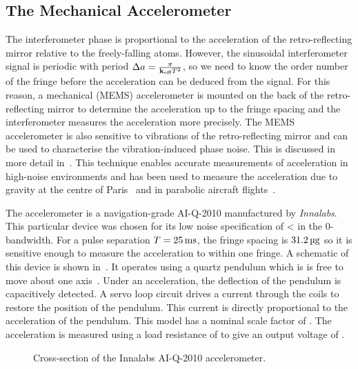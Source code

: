 \subsection{The Mechanical Accelerometer}\label{subsec:raman_mems}
The interferometer phase is proportional to the acceleration of the
retro-reflecting mirror relative to the freely-falling atoms. However,
the sinusoidal interferometer signal is periodic with period
\(\Delta a = \frac{\pi}{{\textbf k_\textnormal{eff}} T^2}\), so we need to know the order
number of the fringe before the acceleration can be deduced from the
signal. For this reason, a mechanical (MEMS)
accelerometer is mounted on the back of the retro-reflecting mirror to determine the acceleration up to the fringe spacing and the interferometer measures the acceleration more
precisely. 
The MEMS accelerometer is also sensitive to vibrations of the
retro-reflecting mirror and can be used to characterise the
vibration-induced phase noise. This is discussed in more detail
in~. This technique enables
accurate measurements of acceleration in high-noise environments and has been
used to measure the acceleration due to gravity at the centre of
Paris~\cite{Merlet2009} and in parabolic aircraft
flights~\cite{Geiger2011a,Barrett2016}. 
\par\noindent 
The accelerometer is a navigation-grade AI-Q-2010 manufactured by \textit{Innalabs}. This particular
device was chosen for its low noise specification of
< in the 0- bandwidth. For a pulse separation \(T
= \sivalue{25}{\milli\second}\), the fringe spacing is
\(\sivalue{31.2}{\micro\g}\) so it is sensitive enough to measure the
acceleration to within one fringe. A schematic of this device is shown
in~. It operates using a quartz pendulum which is is
free to move about one
axis~\cite{Foote1992,Lawrence1998}\nocite{Lawrence1998a}. Under an acceleration, the
deflection of the pendulum is capacitively detected. A servo loop circuit drives
a current through the coils to restore the position of the pendulum. This
current is directly proportional to the acceleration of the pendulum. This model
has a nominal scale factor of . The
acceleration is measured using a load resistance of  to
give an output voltage of .
\begin{figure}[!htbp] \centering
	\resizebox{0.5\textwidth}{!}{}
	\caption[Innalabs accelerometer cross-section]{Cross-section of the Innalabs
		AI-Q-2010 accelerometer.} \label{fig:innalabs}
\end{figure}

